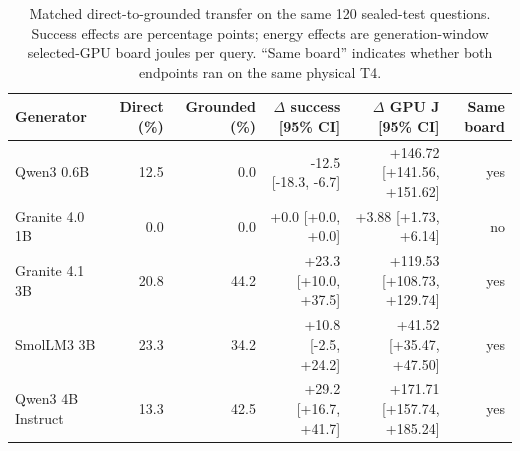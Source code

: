 \begin{table}[t]
\caption{Matched direct-to-grounded transfer on the same 120 sealed-test questions. Success effects are percentage points; energy effects are generation-window selected-GPU board joules per query. ``Same board'' indicates whether both endpoints ran on the same physical T4.}
\label{tab:model-transfer}
\centering
\small
\begin{tabular}{@{}lrrrrr@{}}
\toprule
Generator & Direct (\%) & Grounded (\%) & $\Delta$ success [95\% CI] & $\Delta$ GPU J [95\% CI] & Same board \\
\midrule
Qwen3 0.6B & 12.5 & 0.0 & -12.5 [-18.3, -6.7] & +146.72 [+141.56, +151.62] & yes \\
Granite 4.0 1B & 0.0 & 0.0 & +0.0 [+0.0, +0.0] & +3.88 [+1.73, +6.14] & no \\
Granite 4.1 3B & 20.8 & 44.2 & +23.3 [+10.0, +37.5] & +119.53 [+108.73, +129.74] & yes \\
SmolLM3 3B & 23.3 & 34.2 & +10.8 [-2.5, +24.2] & +41.52 [+35.47, +47.50] & yes \\
Qwen3 4B Instruct & 13.3 & 42.5 & +29.2 [+16.7, +41.7] & +171.71 [+157.74, +185.24] & yes \\
\bottomrule
\end{tabular}
\end{table}
